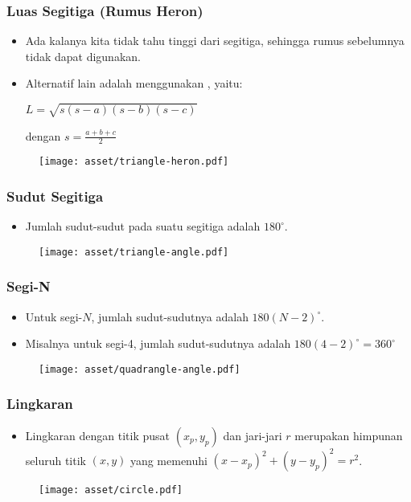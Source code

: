 \begin{frame}
\frametitle{Luas Segitiga (Rumus Heron)}
\begin{itemize}
  \item Ada kalanya kita tidak tahu tinggi dari segitiga, sehingga rumus sebelumnya tidak dapat digunakan.
  \item Alternatif lain adalah menggunakan , yaitu:\newline
    
  \(\displaystyle L = \sqrt{s(s-a)(s-b)(s-c)} \) \newline 
  
  dengan \(\displaystyle s = \frac{a+b+c}{2}\)
  
\end{itemize}
\begin{figure}
  \texttt{[image: asset/triangle-heron.pdf]}
\end{figure}
\end{frame}

\begin{frame}
\frametitle{Sudut Segitiga}
\begin{itemize}
  \item Jumlah sudut-sudut pada suatu segitiga adalah $180^{\circ}$.
\end{itemize}
\begin{figure}
  \texttt{[image: asset/triangle-angle.pdf]}
\end{figure}
\end{frame}

\begin{frame}
\frametitle{Segi-N}
\begin{itemize}
  \item Untuk segi-$N$, jumlah sudut-sudutnya adalah $180(N - 2)^{\circ}$.
  \item Misalnya untuk segi-4, jumlah sudut-sudutnya adalah $180(4 - 2)^{\circ} = 360^{\circ}$
\end{itemize}
\begin{figure}
  \texttt{[image: asset/quadrangle-angle.pdf]}
\end{figure}
\end{frame}

\begin{frame}
\frametitle{Lingkaran}
\begin{itemize}
  \item Lingkaran dengan titik pusat $(x_p, y_p)$ dan jari-jari $r$ merupakan himpunan seluruh titik $(x, y)$ yang memenuhi $(x - x_p)^2 + (y - y_p)^2 = r^2$.
\end{itemize}
\begin{figure}
  \texttt{[image: asset/circle.pdf]}
\end{figure}
\end{frame}

